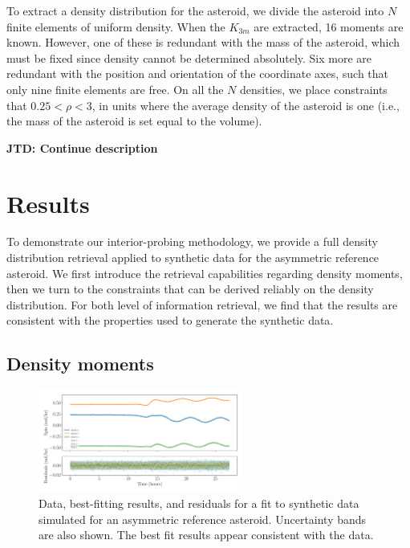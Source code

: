 \documentclass[fleqn,usenatbib]{mnras}
\newcommand{\jtd}[1]{ {\bf{\color{red} JTD: #1}} }
\begin{document}
To extract a density distribution for the asteroid, we divide the asteroid into $N$ finite elements of uniform density. When the $K_{3m}$ are extracted, 16 moments are known. However, one of these is redundant with the mass of the asteroid, which must be fixed since density cannot be determined absolutely. Six more are redundant with the position and orientation of the coordinate axes, such that only nine finite elements are free. On all the $N$ densities, we place constraints that $0.25 < \rho < 3$, in units where the average density of the asteroid is one (i.e., the mass of the asteroid is set equal to the volume).

\jtd{Continue description}



\section{Results}
\label{sec:results}

To demonstrate our interior-probing methodology, we provide a full density distribution retrieval applied to synthetic data for the asymmetric reference asteroid. We first introduce the retrieval capabilities regarding density moments, then we turn to the constraints that can be derived reliably on the density distribution. For both level of information retrieval, we find that the results are consistent with the properties used to generate the synthetic data.

\subsection{Density moments}
\label{sec:example-fit}
\begin{figure}
  \centering
  \includegraphics[width=0.6\textwidth]{figs/example-residuals.pdf}
  \caption{Data, best-fitting results, and residuals for a fit to synthetic data simulated for an asymmetric reference asteroid. Uncertainty bands are also shown. The best fit results appear consistent with the data.}
  \label{fig:example-residuals}
\end{figure}
\end{document}
